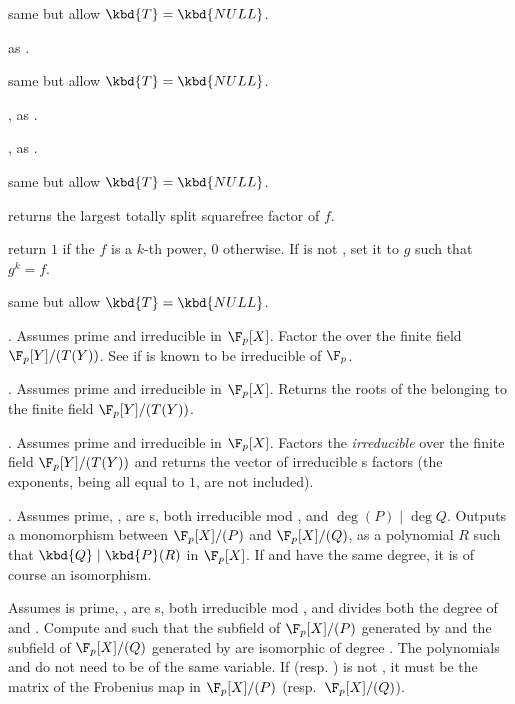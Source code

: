  same but allow
$\kbd{T} = \kbd{NULL}$.

 as .

 same but allow $\kbd{T} = \kbd{NULL}$.

, as
.

, as .

 same but allow
$\kbd{T} = \kbd{NULL}$.

 returns the largest totally
split squarefree factor of $f$.

return $1$ if the  $f$ is a $k$-th power, $0$ otherwise.
If  is not , set it to $g$ such that $g^k = f$.

same but allow $\kbd{T} = \kbd{NULL}$.

. Assumes  prime
and  irreducible in $\F_p[X]$. Factor the  
over the finite field $\F_p[Y]/(T(Y))$. See 
if  is known to be irreducible of $\F_p$.

. Assumes  prime
and  irreducible in $\F_p[X]$. Returns the roots of the 
 belonging to the finite field $\F_p[Y]/(T(Y))$.

. Assumes  prime
and  irreducible in $\F_p[X]$. Factors the \emph{irreducible}
  over the finite field $\F_p[Y]/(T(Y))$ and returns the
vector of irreducible s factors (the exponents, being all equal to
$1$, are not included).

. Assumes  prime,
,  are s, both irreducible mod , and
$\deg(P) \mid \deg Q$. Outputs a monomorphism between $\F_p[X]/(P)$ and
$\F_p[X]/(Q)$, as a polynomial $R$ such that $\kbd{Q} \mid \kbd{P}(R)$ in
$\F_p[X]$. If  and  have the same degree, it is of course an
isomorphism.

\hfil\break
Assumes  is prime, ,  are s, both
irreducible mod , and  divides both the degree of  and
. Compute  and  such that the subfield of
$\F_p[X]/(P)$ generated by  and the subfield of $\F_p[X]/(Q)$
generated by  are isomorphic of degree . The polynomials
 and  do not need to be of the same variable. If 
(resp. ) is not , it must be the matrix of the Frobenius
map in $\F_p[X]/(P)$ (resp.~$\F_p[X]/(Q)$).

